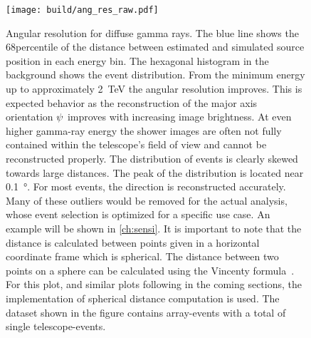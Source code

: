 \begin{figure}
    \centering
    \texttt{[image: build/ang\_res\_raw.pdf]}
    \caption[Angular resolution for diffuse gamma rays]{Angular resolution for diffuse gamma rays.
    The blue line shows the 68\th percentile of the distance between estimated and simulated source position in each energy bin. 
    The hexagonal histogram in the background shows the event distribution. 
    From the minimum energy up to approximately \SI{2}{TeV} the angular resolution improves. This is expected behavior as the reconstruction of the major axis orientation $\psi$ improves with increasing 
    image brightness. At even higher gamma-ray energy the shower images are often not fully contained within the telescope's field of view and 
    cannot be reconstructed properly. The distribution of events is clearly skewed towards large distances. The peak of the distribution 
    is located near \SI{0.1}{\degree}. For most events, the direction is reconstructed accurately. Many of these outliers would be removed for the actual 
    analysis, whose event selection is optimized for a specific use case. An example will be shown in \cref{ch:sensi}. 
    It is important to note that the distance is calculated between points given in a horizontal coordinate frame which is spherical.
    The distance between two points on a sphere can be calculated using the Vincenty formula~\cite{vincenty}. For this plot, and similar plots following 
    in the coming sections, the \astropy implementation of spherical distance computation is used.
    The dataset shown in the figure contains  array-events with a total of  
    single telescope-events.
    }
    \label{fig:ang_res_raw}
\end{figure}


